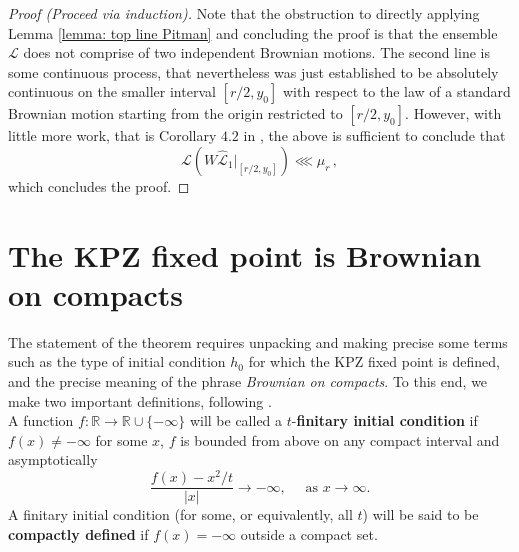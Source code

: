 \documentclass[12pt]{report}
\theoremstyle{plain}
\newcommand{\R}{\ensuremath{\mathbb{R}}}
\begin{document}
\begin{proof}[Proof (Proceed via induction)]
Note that the obstruction to directly applying Lemma \ref{lemma: top line Pitman} and concluding the proof is that the ensemble $\mathbf{\mathcal{L}}$ does not comprise of two independent Brownian motions. The second line is some continuous process, that nevertheless was just established to be absolutely continuous on the smaller interval $[r/2, y_0]$ with respect to the law of a standard Brownian motion starting from the origin restricted to $[r/2, y_0]$. However, with little more work, that is Corollary $4.2$ in \cite{sarkar2021brownian}, the above is sufficient to conclude that  
\[
\mathcal{L}(W\hat{\mathcal{L}}_1|_{[r/2, y_0]})\lll\mu_r\,,
\]
which concludes the proof.

\end{proof}


\chapter{The KPZ fixed point is Brownian on compacts}

The statement of the theorem requires unpacking and making precise some terms such as the type of initial condition \(h_0\) for which the KPZ fixed point is defined, and the precise meaning of the phrase \textit{Brownian on compacts}. To this end, we make two important definitions, following \cite{sarkar2021brownian}.\\

A function $f:\R\to \R\cup \{-\infty\}$ will be called a $t$-{\bf finitary initial condition} if $f(x)\neq -\infty$ for some $x$, $f$ is bounded from above on any compact interval and asymptotically
\begin{equation}\label{eq: t-finitary}
\frac{f(x)-x^2/t}{|x|}\to -\infty, \quad \text{ as } x\to \infty.
\end{equation}
A finitary initial condition (for some, or equivalently, all $t$) will be said to be {\bf compactly defined} if $f(x)=-\infty$ outside a compact set.\\
\end{document}
